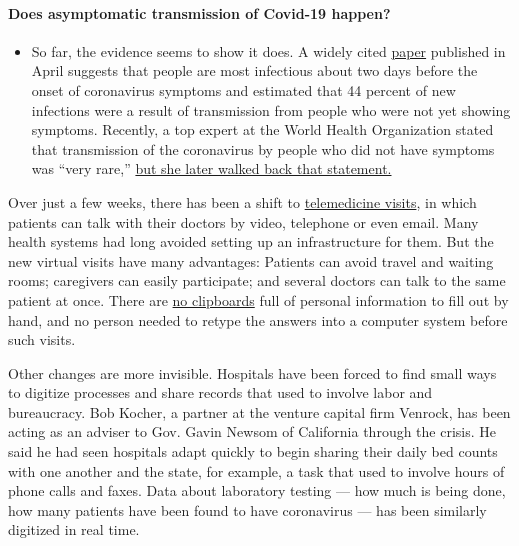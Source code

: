 \begin{itemize}
{  \paragraph{Does asymptomatic transmission of Covid-19
  happen?}\label{does-asymptomatic-transmission-of-covid-19-happen}}

  \begin{itemize}
  \tightlist
  \item
    So far, the evidence seems to show it does. A widely cited
    \href{https://www.nature.com/articles/s41591-020-0869-5}{paper}
    published in April suggests that people are most infectious about
    two days before the onset of coronavirus symptoms and estimated that
    44 percent of new infections were a result of transmission from
    people who were not yet showing symptoms. Recently, a top expert at
    the World Health Organization stated that transmission of the
    coronavirus by people who did not have symptoms was ``very rare,''
    \href{https://www.nytimes3xbfgragh.onion/2020/06/09/world/coronavirus-updates.html?action=click\&pgtype=Article\&state=default\&region=MAIN_CONTENT_3\&context=storylines_faq\#link-1f302e21}{but
    she later walked back that statement.}
  \end{itemize}
\end{itemize}

Over just a few weeks, there has been a shift to
\href{https://www.nytimes3xbfgragh.onion/2020/03/11/health/telemedicine-coronavirus.html}{telemedicine
visits}, in which patients can talk with their doctors by video,
telephone or even email. Many health systems had long avoided setting up
an infrastructure for them. But the new virtual visits have many
advantages: Patients can avoid travel and waiting rooms; caregivers can
easily participate; and several doctors can talk to the same patient at
once. There are
\href{https://www.nytimes3xbfgragh.onion/2016/09/08/upshot/release-your-medical-records-first-you-must-collect-them.html}{no
clipboards} full of personal information to fill out by hand, and no
person needed to retype the answers into a computer system before such
visits.

Other changes are more invisible. Hospitals have been forced to find
small ways to digitize processes and share records that used to involve
labor and bureaucracy. Bob Kocher, a partner at the venture capital firm
Venrock, has been acting as an adviser to Gov. Gavin Newsom of
California through the crisis. He said he had seen hospitals adapt
quickly to begin sharing their daily bed counts with one another and the
state, for example, a task that used to involve hours of phone calls and
faxes. Data about laboratory testing --- how much is being done, how
many patients have been found to have coronavirus --- has been similarly
digitized in real time.


